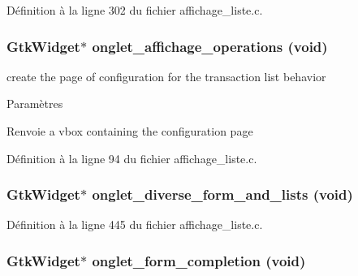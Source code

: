Définition à la ligne 302 du fichier affichage\_\-liste.c.

\subsubsection[{onglet\_\-affichage\_\-operations}]{\setlength{\rightskip}{0pt plus 5cm}GtkWidget$\ast$ onglet\_\-affichage\_\-operations (void)}\label{affichage__liste_8c_a822e762a82cda85425acf41f0be4ef90}
create the page of configuration for the transaction list behavior


\begin{DoxyParams}{Paramètres}
\item[{\em }]\end{DoxyParams}
\begin{DoxyReturn}{Renvoie}
a vbox containing the configuration page 
\end{DoxyReturn}


Définition à la ligne 94 du fichier affichage\_\-liste.c.

\subsubsection[{onglet\_\-diverse\_\-form\_\-and\_\-lists}]{\setlength{\rightskip}{0pt plus 5cm}GtkWidget$\ast$ onglet\_\-diverse\_\-form\_\-and\_\-lists (void)}\label{affichage__liste_8c_a33da4cf29fe0704c65a8d2c3fc88700c}


Définition à la ligne 445 du fichier affichage\_\-liste.c.

\subsubsection[{onglet\_\-form\_\-completion}]{\setlength{\rightskip}{0pt plus 5cm}GtkWidget$\ast$ onglet\_\-form\_\-completion (void)}\label{affichage__liste_8c_a35c31378d6ff0acbfdd295ef8dea0982}


